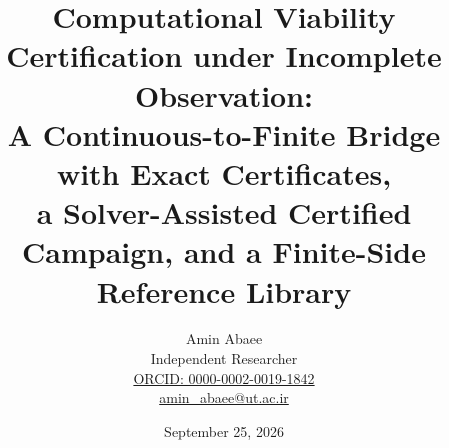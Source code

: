 \documentclass[10pt,twocolumn]{article}
\theoremstyle{plain}
\theoremstyle{definition}
\theoremstyle{remark}
\begin{document}
\title{Computational Viability Certification under Incomplete Observation:\\
A Continuous-to-Finite Bridge with Exact Certificates,\\
a Solver-Assisted Certified Campaign, and a Finite-Side Reference Library}
\newcommand{\edition}{2}
\author{Amin Abaee\\[0.35em]
{\small Independent Researcher}\\[0.55em]
{\small\href{https://orcid.org/0000-0002-0019-1842}{ORCID: 0000-0002-0019-1842}}\\[0.3em]
{\small\href{mailto:amin\_abaee@ut.ac.ir}{amin\_abaee@ut.ac.ir}}}
\date{September 25, 2026}
\maketitle
\end{document}
